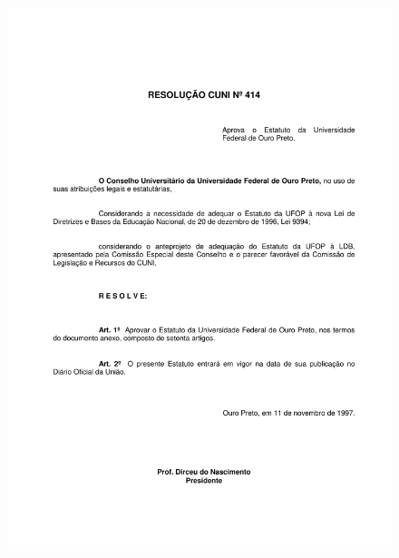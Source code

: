 \label{cuni414}
\begin{figure}[p]
	\centering 
	\includegraphics[scale=0.7]{capitulos/resolucoes/cuni414/cuni414-1.pdf}
\end{figure} \pagebreak

